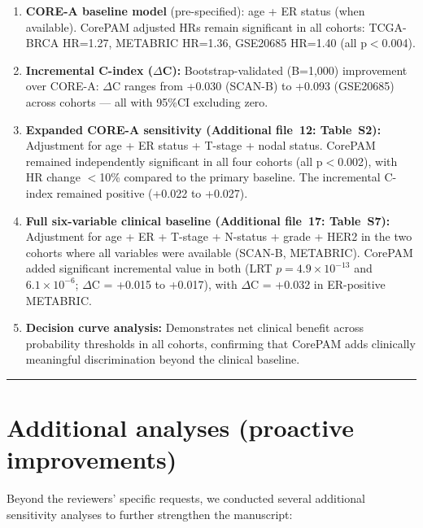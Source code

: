 \documentclass[11pt]{article}
\begin{document}
\begin{enumerate}
  \item \textbf{CORE-A baseline model} (pre-specified): age + ER status (when available). CorePAM adjusted HRs remain significant in all cohorts: TCGA-BRCA HR=1.27, METABRIC HR=1.36, GSE20685 HR=1.40 (all p$<$0.004).
  \item \textbf{Incremental C-index ($\Delta$C):} Bootstrap-validated (B=1,000) improvement over CORE-A: $\Delta$C ranges from +0.030 (SCAN-B) to +0.093 (GSE20685) across cohorts --- all with 95\%CI excluding zero.
  \item \textbf{Expanded CORE-A sensitivity (Additional file~12: Table~S2):} Adjustment for age + ER status + T-stage + nodal status. CorePAM remained independently significant in all four cohorts (all p$<$0.002), with HR change $<$10\% compared to the primary baseline. The incremental C-index remained positive (+0.022 to +0.027).
  \item \textbf{Full six-variable clinical baseline (Additional file~17: Table~S7):} Adjustment for age + ER + T-stage + N-status + grade + HER2 in the two cohorts where all variables were available (SCAN-B, METABRIC). CorePAM added significant incremental value in both (LRT $p = 4.9 \times 10^{-13}$ and $6.1 \times 10^{-6}$; $\Delta$C = +0.015 to +0.017), with $\Delta$C = +0.032 in ER-positive METABRIC.
  \item \textbf{Decision curve analysis:} Demonstrates net clinical benefit across probability thresholds in all cohorts, confirming that CorePAM adds clinically meaningful discrimination beyond the clinical baseline.
\end{enumerate}

\bigskip\hrule\bigskip

\section*{Additional analyses (proactive improvements)}

Beyond the reviewers' specific requests, we conducted several additional sensitivity analyses to further strengthen the manuscript:
\end{document}

